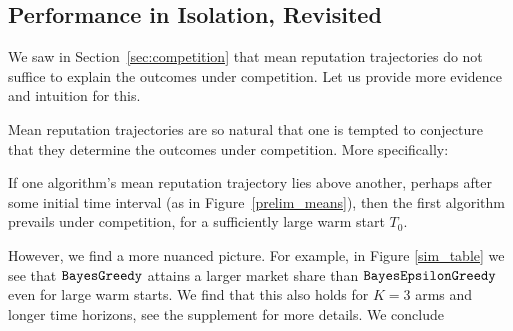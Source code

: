 \documentclass[../competing_bandits_with_appendix.tex]{subfiles}
\begin{document}
\subsection{Performance in Isolation, Revisited}\label{sec:revisited}


We saw in Section~\ref{sec:competition} that mean reputation trajectories do not suffice to explain the outcomes under competition. Let us provide more evidence and intuition for this.

Mean reputation trajectories are so natural that one is tempted to conjecture that they determine the outcomes under competition. More specifically:
\begin{conjecture}\label{conj:mean-trajectories}
If one algorithm's mean reputation trajectory lies above another, perhaps after some initial time interval (\eg as in Figure~\ref{prelim_means}), then the first algorithm prevails under competition, for a sufficiently large warm start $T_0$.
\end{conjecture}

However, we find a more nuanced picture. For example, in Figure \ref{sim_table} we see that $\mathtt{BayesGreedy}$ attains a larger market share than $\mathtt{BayesEpsilonGreedy}$ even for large warm starts. We find that this also holds for $K = 3$ arms and longer time horizons, see the supplement for more details. We conclude 
\end{document}
